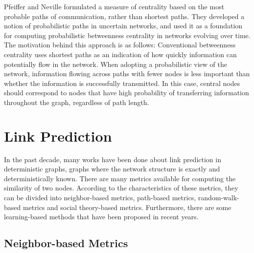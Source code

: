 \documentclass[\main/thesis.tex]{subfiles}
\begin{document}
Pfeiffer and Neville \cite{pfeiffer2010probabilistic} formulated a measure of centrality based on the most probable paths of communication, rather than shortest paths. They developed a notion of probabilistic paths in uncertain networks, and used it as a foundation for computing probabilistic betweenness centrality in networks evolving over time. The motivation behind this approach is as follows: Conventional betweenness centrality uses shortest paths as an indication of how quickly information can potentially flow in the network. When adopting a probabilistic view of the network, information flowing across paths with fewer nodes is less important than whether the information is successfully transmitted. In this case, central nodes should correspond to nodes that have high probability of transferring information throughout the graph, regardless of path length.

\newpage

\section{Link Prediction}\label{previous:link-prediction}

In the past decade, many works have been done about link prediction in deterministic graphs, graphs where the network structure is exactly and deterministically known. There are many metrics available for computing the similarity of two nodes. According to the characteristics of these metrics, they can be divided into neighbor-based metrics, path-based metrics, random-walk-based metrics and social theory-based metrics. Furthermore, there are some learning-based methods that have been proposed in recent years.
\subsection{Neighbor-based Metrics} \label{neighbor-based-metrics}
\end{document}
